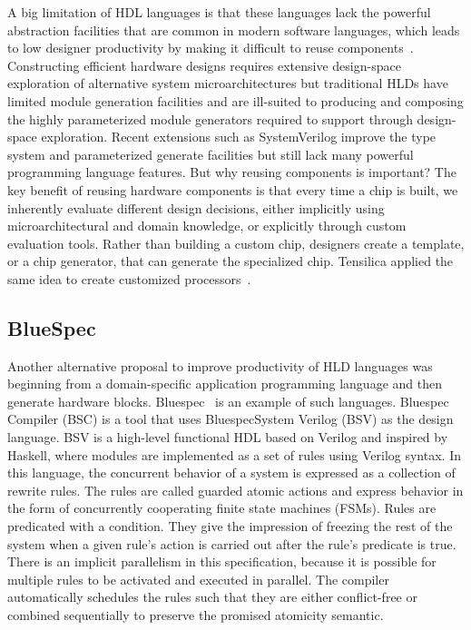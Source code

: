 A big limitation of HDL languages is that these languages lack the powerful abstraction facilities that
are common in modern software languages, which leads to low designer productivity by making it difficult to reuse components~\cite{shacham_rethinking_2010}.
Constructing efficient hardware designs requires extensive design-space exploration of alternative system microarchitectures but traditional HLDs have limited module generation facilities and are ill-suited to producing and composing the highly parameterized module generators required to support through design-space exploration.
Recent extensions such as SystemVerilog improve the type system and parameterized generate facilities but still lack many powerful programming language features.
But why reusing components is important?
The key benefit of reusing hardware components is that every time a chip is built, we inherently evaluate different design decisions, either implicitly using microarchitectural and domain knowledge, or explicitly through custom evaluation tools.
Rather than building a custom chip, designers create a template, or a chip generator, that can generate the specialized chip. Tensilica applied the same idea to create customized processors~\cite{tensillica}.

\subsection{BlueSpec}

Another alternative proposal to improve productivity of HLD languages was beginning from a domain-specific application programming language and then generate hardware blocks. 
Bluespec~\cite{bluespec} is an example of such languages.
Bluespec Compiler (BSC) is a tool that uses BluespecSystem  Verilog  (BSV)  as  the  design  language.
BSV is a high-level functional HDL based on Verilog and inspired by Haskell, where  modules are implemented as a set of rules using  Verilog  syntax.
In this language, the concurrent behavior of a system is expressed as a collection of rewrite rules.
The rules are called guarded atomic actions and express behavior in the form of concurrently cooperating finite state machines (FSMs).
Rules are predicated with a condition. They give the impression of freezing the rest of the system when a given rule's action is carried out after the rule's predicate is true.
There is an implicit parallelism in this specification, because it is possible for multiple rules to be activated and executed in parallel.
The compiler automatically schedules the rules such that they are either conflict-free or combined sequentially to preserve the promised atomicity semantic.

